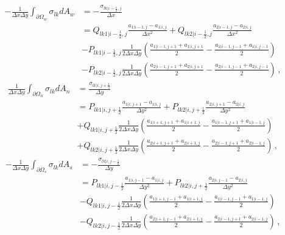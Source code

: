 \documentclass[11pt,a4paper]{article}
\begin{document}
\begin{align*}
    -\frac{1}{\Delta x \Delta y} \int_{\partial \Omega_w} \sigma_{lk} dA_w
    & = 
    -\frac{\sigma_{lk|i-\frac{1}{2},j}}{\Delta x}
    \\
    & = 
    Q_{lk1|i-\frac{1}{2},j} \frac{a_{1|i-1,j}-a_{1|i,j}}{\Delta x^2}
    +
    Q_{lk2|i-\frac{1}{2},j} \frac{a_{2|i-1,j}-a_{2|i,j}}{\Delta x^2}
    \\
    & - 
    P_{lk1|i-\frac{1}{2},j} \frac{1}{2\Delta x \Delta y} 
    \left(
        \frac{a_{1|i-1,j+1}+a_{1|i,j+1}}{2}
        - \frac{a_{1|i-1,j-1}+a_{1|i,j-1}}{2}
    \right)
    \\
    & - 
    P_{lk2|i-\frac{1}{2},j} \frac{1}{2\Delta x \Delta y} 
    \left(
        \frac{a_{2|i-1,j+1}+a_{2|i,j+1}}{2}
        - \frac{a_{2|i-1,j-1}+a_{2|i,j-1}}{2}
    \right)
    \,,
\end{align*}
\begin{align*}
    \frac{1}{\Delta x \Delta y} \int_{\partial \Omega_n} \sigma_{lk} dA_n
    & = 
    \frac{\sigma_{lk|i,j+\frac{1}{2}}}{\Delta y}
    \\
    & = 
    P_{lk1|i,j+\frac{1}{2}} \frac{a_{1|i,j+1}-a_{1|i,j}}{\Delta y^2}
    +
    P_{lk2|i,j+\frac{1}{2}} \frac{a_{2|i,j+1}-a_{2|i,j}}{\Delta y^2}
    \\
    & + 
    Q_{lk1|i,j+\frac{1}{2}} \frac{1}{2\Delta x \Delta y} 
    \left(
        \frac{a_{1|i+1,j+1}+a_{1|i+1,j}}{2}
        - \frac{a_{1|i-1,j+1}+a_{1|i-1,j}}{2}
    \right)
    \\
    & + 
    Q_{lk2|i,j+\frac{1}{2}} \frac{1}{2\Delta x \Delta y} 
    \left(
        \frac{a_{2|i+1,j+1}+a_{2|i+1,j}}{2}
        - \frac{a_{2|i-1,j+1}+a_{2|i-1,j}}{2}
    \right)
    \,,
\end{align*}
\begin{align*}
    -\frac{1}{\Delta x \Delta y} \int_{\partial \Omega_s} \sigma_{lk} dA_s
    & = 
    -\frac{\sigma_{lk|i,j-\frac{1}{2}}}{\Delta y}
    \\
    & = 
    P_{lk1|i,j-\frac{1}{2}} \frac{a_{1|i,j-1}-a_{1|i,j}}{\Delta y^2}
    +
    P_{lk2|i,j+\frac{1}{2}} \frac{a_{2|i,j-1}-a_{2|i,j}}{\Delta y^2}
    \\
    & - 
    Q_{lk1|i,j-\frac{1}{2}} \frac{1}{2\Delta x \Delta y} 
    \left(
        \frac{a_{1|i+1,j-1}+a_{1|i+1,j}}{2}
        - \frac{a_{1|i-1,j-1}+a_{1|i-1,j}}{2}
    \right)
    \\
    & - 
    Q_{lk2|i,j-\frac{1}{2}} \frac{1}{2\Delta x \Delta y} 
    \left(
        \frac{a_{2|i+1,j-1}+a_{2|i+1,j}}{2}
        - \frac{a_{2|i-1,j+1}+a_{2|i-1,j}}{2}
    \right)
    \,,
\end{align*}
\end{document}
